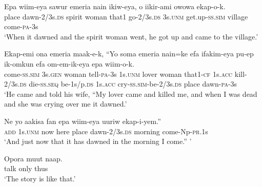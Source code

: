 {\ea\label{ex:a:x14}
\gll  Epa  wiim-eya  sawur  emeria  nain  ikiw-eya,  o  iikir-ami             owowa  ekap-o-k. \\
place  dawn-2/3s.\textsc{ds}  spirit  woman  that1  go-2/3s.\textsc{ds}  3s.\textsc{unm}  get.up-\textsc{ss}.\textsc{sim}  village  come-\textsc{pa}-3s \\


\glt ‘When it dawned and the spirit woman went, he got up and came to the village.’ \\
\z


\ea\label{ex:a:x15}
\gll  Ekap-emi  ona  emeria  maak-e-k,  “Yo  soma  emeria  nain=ke  efa          ifakim-eya  pu-ep  ik-omkun  efa  om-em-ik-eya                       epa  wiim-o-k. \\
come-\textsc{ss}.\textsc{sim}  3s.\textsc{gen}  woman  tell-\textsc{pa}-3s  1s.\textsc{unm}  lover  woman  that1-\textsc{cf}  1s.\textsc{acc}   kill-2/3s.\textsc{ds}  die-\textsc{ss.seq}  be-1s/p.\textsc{ds}  1s.\textsc{acc}  cry-\textsc{ss}.\textsc{sim}-be-2/3s.\textsc{ds}  place  dawn-\textsc{pa}-3s \\




\glt ‘He came and told his wife, “My lover came and killed me, and when I was dead and she was crying over me it dawned.’ \\
\z


\ea\label{ex:a:x16}
\gll  Ne  yo  aakisa  fan  epa  wiim-eya  uuriw  ekap-i-yem.” \\
\textsc{add}  1s.\textsc{unm}  now  here  place  dawn-2/3s.\textsc{ds}  morning  come-Np-\textsc{pr}.1s \\
\glt ‘And just now that it has dawned in the morning I come.” ’ \\
\z


\ea\label{ex:a:x17}
\gll  Opora  muut  naap. \\
talk  only  thus \\
\glt ‘The story is like that.’ \\
\z


}
